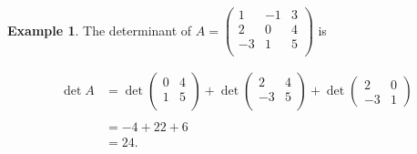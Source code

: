 \documentclass[11pt,a4paper]{article}
\theoremstyle{definition}
\newtheorem{exa}[thm]{Example}
\begin{document}
\begin{exa}
The determinant of $A=
\begin{pmatrix}
1&-1&3\\2&0&4\\-3&1&5\\
\end{pmatrix}
$ is

\begin{align*}
\det A &=\det
\begin{pmatrix}
0&4\\1&5\\
\end{pmatrix}
+\det
\begin{pmatrix}
2&4\\-3&5\\
\end{pmatrix}
+\det
\begin{pmatrix}
2&0\\-3&1
\end{pmatrix}\\\\
&=-4+22+6\\
&=24.\\
\end{align*}


\end{exa}
\end{document}

